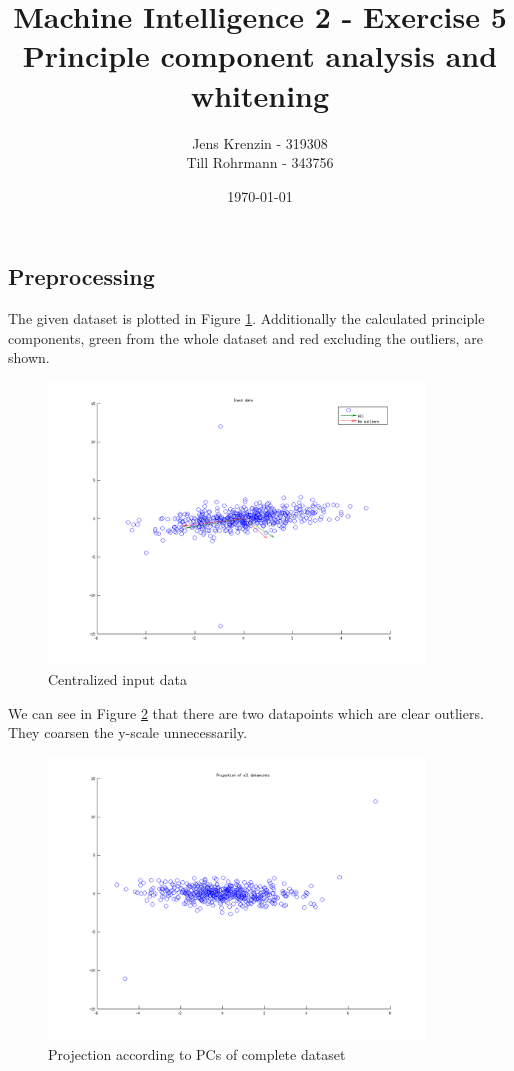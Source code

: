\documentclass{article}
\title{Machine Intelligence 2 - Exercise 5\\
Principle component analysis and whitening}
\author{Jens Krenzin - 319308\\
Till Rohrmann - 343756}
\date{\today}
\begin{document}
	\maketitle
	\setcounter{section}{4}
	\subsection{Preprocessing}
		The given dataset is plotted in Figure \ref{fig:task1Input}. Additionally the calculated principle components, green from the whole dataset and red excluding the outliers, are shown.
		\begin{figure}[H]
			\centering
			\includegraphics[width=10cm]{task1Input.png}
			\caption{Centralized input data}
			\label{fig:task1Input}
		\end{figure}
		
		We can see in Figure \ref{fig:task1Projection} that there are two datapoints which are clear outliers. They coarsen the y-scale unnecessarily.
		\begin{figure}[H]
			\centering
			\includegraphics[width=10cm]{task1Projection.png}
			\caption{Projection according to PCs of complete dataset}
			\label{fig:task1Projection}
		\end{figure}
		
\end{document}
